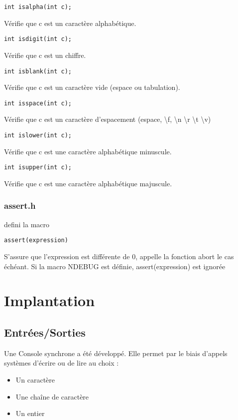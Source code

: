 \documentclass{article}
\begin{document}
\begin{verbatim}
int isalpha(int c);
\end{verbatim}
Vérifie que c est un caractère alphabétique.

\begin{verbatim}
int isdigit(int c);
\end{verbatim}
Vérifie que c est un chiffre.

\begin{verbatim}
int isblank(int c);
\end{verbatim}
Vérifie que c est un caractère vide (espace ou tabulation).

\begin{verbatim}
int isspace(int c);
\end{verbatim}
Vérifie que c est un caractère d'espacement (espace, \textbackslash f,
\textbackslash n \textbackslash r \textbackslash t \textbackslash v)

\begin{verbatim}
int islower(int c);
\end{verbatim}
Vérifie que c est une caractère alphabétique minuscule.

\begin{verbatim}
int isupper(int c);
\end{verbatim}
Vérifie que c est une caractère alphabétique majuscule.

\subsubsection{assert.h}
defini la macro
\begin{verbatim}
assert(expression)
\end{verbatim}

S'assure que l'expression est différente de 0, appelle la fonction abort le cas échéant.
Si la macro NDEBUG est définie, assert(expression) est ignorée
\section{Implantation}
\subsection{Entrées/Sorties}
Une Console synchrone a été développé. Elle permet par le biais d'appels systèmes d'écrire ou de lire au choix :

\begin{itemize}
\item Un caractère
\item Une chaîne de caractère
\item Un entier
\end{itemize}
\end{document}
